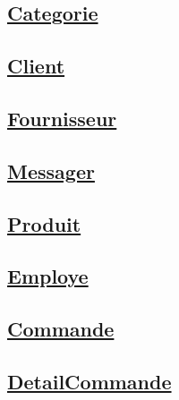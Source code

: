 \subsection*{\underline{Categorie}}



\subsection*{\underline{Client}}



\subsection*{\underline{Fournisseur}}



\newpage
\subsection*{\underline{Messager}}



\subsection*{\underline{Produit}}



\subsection*{\underline{Employe}}



\newpage
\subsection*{\underline{Commande}}


\subsection*{\underline{DetailCommande}}


